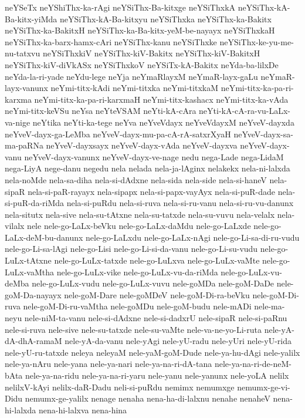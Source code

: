 {neYSeTx
neYShiThx-ka-rAgi
neYSiThx-Ba-kitxge
neYSiThxkA
neYSiThx-kA-Ba-kitx-yiMda
neYSiThx-kA-Ba-kitxyu
neYSiThxka
neYSiThx-ka-Bakitx
neYSiThx-ka-BakitxH
neYSiThx-ka-Ba-kitx-yeM-be-nayayx
neYSiThxkaH
neYSiThx-ka-barx-hamx-cAri
neYSiThx-kanu
neYSiThxke
neYSiThx-ke-yu-me-nu-tatxvu
neYSiThxkiV
neYSiThx-kiV-Bakitx
neYSiThx-kiV-BakitxH
neYSiThx-kiV-diVkASx
neYSiThxkoV
neYSiTx-kA-Bakitx
neYda-ba-lilxDe
neYda-la-ri-yade
neYdu-lege
neYja
neYmaRlayxM
neYmaR-layx-gaLu
neYmaR-layx-vanunx
neYmi-titx-kAdi
neYmi-titxka
neYmi-titxkaM
neYmi-titx-ka-pa-ri-karxma
neYmi-titx-ka-pa-ri-karxmaH
neYmi-titx-kashacx
neYmi-titx-ka-vAda
neYmi-titx-keVSu
neYsa
neYteVSAM
neYti-kA-cAra
neYti-kA-cA-ra-vu-LaLx-va-nige
neYtika
neYti-ka-tege
neYva
neYveVdayx
neYveVdayxM
neYveV-dayxda
neYveV-dayx-ga-LeMba
neYveV-dayx-mu-pa-cA-rA-satxrXyaH
neYveV-dayx-sa-ma-paRNa
neYveV-dayxsayx
neYveV-dayx-vAda
neYveV-dayxva
neYveV-dayx-vanu
neYveV-dayx-vanunx
neYveV-dayx-ve-nage
nedu
nega-Lade
nega-LidaM
nega-LiyA
nege-danu
negedu
nela
nelada
nela-ja-lAginx
nelakekx
nela-ni-lalxda
nela-noMde
nela-sa-diha
nela-si-dAdxne
nela-sida
nela-side
nela-si-haneV
nela-sipaR
nela-si-paR-rayayx
nela-sipapx
nela-si-papx-vayAyx
nela-si-puR-dade
nela-si-puR-da-riMda
nela-si-puRdu
nela-si-ruva
nela-si-ru-vanu
nela-si-ru-vu-danunx
nela-situtx
nela-sive
nela-su-tAtxne
nela-su-tatxde
nela-su-vuvu
nela-velalx
nela-vilalx
nele
nele-go-LaLx-beVku
nele-go-LaLx-daMdu
nele-go-LaLxde
nele-go-LaLx-deM-bu-danunx
nele-go-LaLxdu
nele-go-LaLx-nAgi
nele-go-Li-sa-di-ru-vudu
nele-go-Li-sa-lAgi
nele-go-Lisi
nele-go-Li-si-da-vanu
nele-go-Li-su-vudu
nele-go-LuLx-tAtxne
nele-go-LuLx-tatxde
nele-go-LuLxva
nele-go-LuLx-vaMte
nele-go-LuLx-vaMtha
nele-go-LuLx-vike
nele-go-LuLx-vu-da-riMda
nele-go-LuLx-vu-deMba
nele-go-LuLx-vudu
nele-go-LuLx-vuvu
nele-goMDa
nele-goM-DaDe
nele-goM-Da-nayayx
nele-goM-Dare
nele-goMDeV
nele-goM-Di-ra-beVku
nele-goM-Di-ruva
nele-goM-Di-ru-vaMtha
nele-goMDu
nele-goM-budu
nele-mADi
nele-ma-neyu
nele-niM-ta-vanu
nele-si-dAdxne
nele-si-dadxrU
nele-sipaR
nele-si-paRnu
nele-si-ruva
nele-sive
nele-su-tatxde
nele-su-vaMte
nele-va-ne-yo-Li-ruta
nele-yA-dA-dhA-ramaM
nele-yA-da-vanu
nele-yAgi
nele-yU-radu
nele-yUri
nele-yU-rida
nele-yU-ru-tatxde
neleya
neleyaM
nele-yaM-goM-Dude
nele-ya-hu-dAgi
nele-yalilx
nele-ya-nAru
nele-yana
nele-ya-nari
nele-ya-na-ri-dA-tana
nele-ya-na-ri-de-neM-bAta
nele-ya-na-ridu
nele-ya-na-ri-yaru
nele-yanu
nele-yanunx
nele-yoLA
nelilx
nelilxV-kAyi
nelilx-daR-Dadu
neli-si-puRdu
nemimx
nemumxge
nemumx-ge-vi-Didu
nemumx-ge-yalilx
nenage
nenaha
nena-ha-di-lalxnu
nenahe
nenaheV
nena-hi-lalxda
nena-hi-lalxva
nena-hina
}
